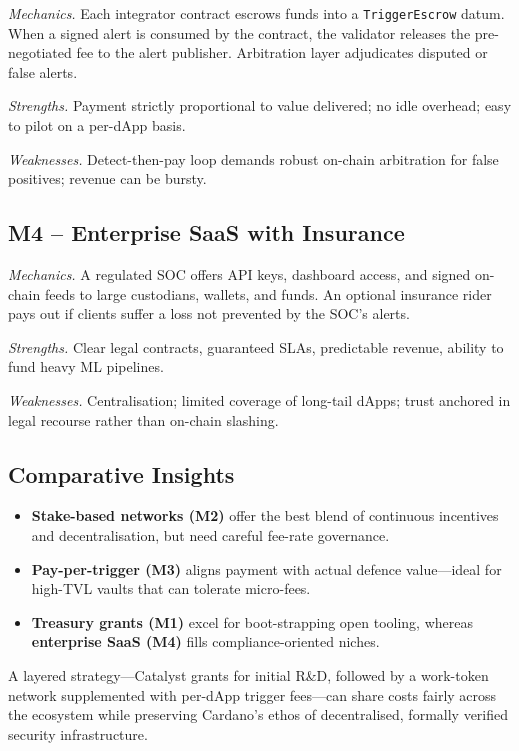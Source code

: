 \documentclass{scrreport}
\begin{document}
\emph{Mechanics.}  Each integrator contract escrows funds into a
\texttt{TriggerEscrow} datum.  When a signed alert is consumed by the
contract, the validator releases the pre-negotiated fee to the alert
publisher.  Arbitration layer adjudicates disputed or false alerts.

\emph{Strengths.}  Payment strictly proportional to value delivered;
no idle overhead; easy to pilot on a per-dApp basis.

\emph{Weaknesses.}  Detect-then-pay loop demands robust on-chain
arbitration for false positives; revenue can be bursty.

\subsection{M4 – Enterprise SaaS with Insurance}

\emph{Mechanics.}  A regulated SOC offers API keys, dashboard access, and
signed on-chain feeds to large custodians, wallets, and funds.
An optional insurance rider pays out if clients suffer a loss not
prevented by the SOC’s alerts.

\emph{Strengths.}  Clear legal contracts, guaranteed SLAs, predictable
revenue, ability to fund heavy ML pipelines.

\emph{Weaknesses.}  Centralisation; limited coverage of long-tail dApps;
trust anchored in legal recourse rather than on-chain slashing.

\subsection*{Comparative Insights}

\begin{itemize}
  \item \textbf{Stake-based networks (M2)} offer the best blend of continuous
        incentives and decentralisation, but need careful fee-rate governance.
  \item \textbf{Pay-per-trigger (M3)} aligns payment with actual defence
        value—ideal for high-TVL vaults that can tolerate micro-fees.
  \item \textbf{Treasury grants (M1)} excel for boot-strapping open tooling,
        whereas \textbf{enterprise SaaS (M4)} fills compliance-oriented niches.
\end{itemize}

A layered strategy—Catalyst grants for initial R\&D, followed by a
work-token network supplemented with per-dApp trigger fees—can
share costs fairly across the ecosystem while preserving Cardano’s ethos
of decentralised, formally verified security infrastructure.
\end{document}
